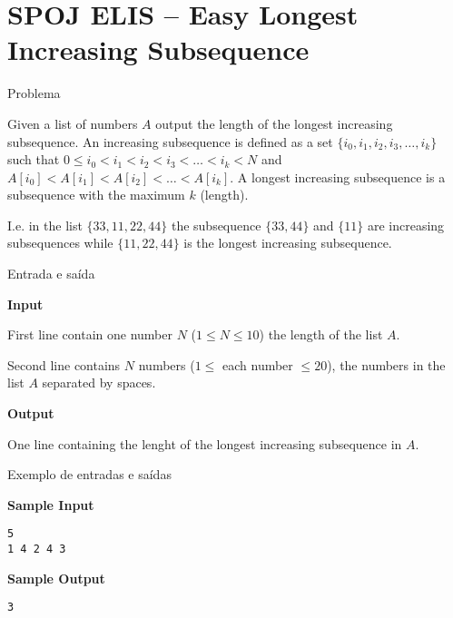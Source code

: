 \section{SPOJ ELIS -- Easy Longest Increasing Subsequence}

\begin{frame}[fragile]{Problema}

Given a list of numbers $A$ output the length of the longest increasing subsequence. An 
increasing subsequence is defined as a set $\{i_0, i_1, i_2, i_3, \ldots, i_k\}$ such that 
$0 \leq i_0 < i_1 < i_2 < i_3 < \ldots < i_k < N$ and $A[i_0] < A[i_1] < A[i_2] < \ldots < 
A[i_k]$. A longest increasing subsequence is a subsequence with the maximum $k$ (length).

I.e. in the list $\{33 , 11 , 22 , 44\}$ the subsequence $\{33 , 44\}$ and $\{11\}$ are
increasing subsequences while $\{11 , 22 , 44\}$ is the longest increasing subsequence.

\end{frame}

\begin{frame}[fragile]{Entrada e saída}

\textbf{Input}

First line contain one number $N$ ($1\leq N\leq 10$) the length of the list $A$.

Second line contains $N$ numbers ($1 \leq$ each number $\leq 20$), the numbers in the list $A$
separated by spaces.

\textbf{Output}

One line containing the lenght of the longest increasing subsequence in $A$.

\end{frame}

\begin{frame}[fragile]{Exemplo de entradas e saídas}

\begin{minipage}[t]{0.45\textwidth}
\textbf{Sample Input}
\begin{verbatim}
5
1 4 2 4 3
\end{verbatim}
\end{minipage}
\begin{minipage}[t]{0.5\textwidth}
\textbf{Sample Output}
\begin{verbatim}
3
\end{verbatim}
\end{minipage}

\end{frame}

